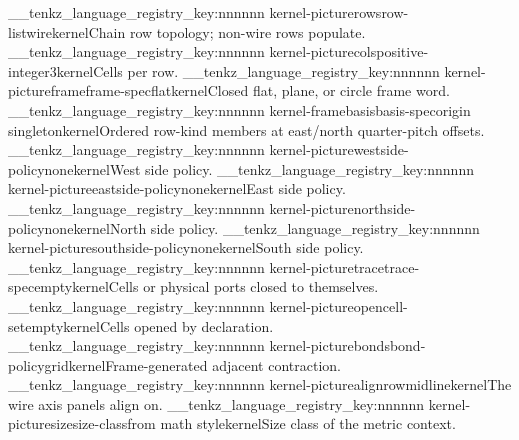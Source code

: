 \__tenkz_language_registry_key:nnnnnn {kernel-picture}{rows}{row-list}{{wire}}{kernel}{Chain row topology; non-wire rows populate.}
\__tenkz_language_registry_key:nnnnnn {kernel-picture}{cols}{positive-integer}{3}{kernel}{Cells per row.}
\__tenkz_language_registry_key:nnnnnn {kernel-picture}{frame}{frame-spec}{flat}{kernel}{Closed flat, plane, or circle frame word.}
\__tenkz_language_registry_key:nnnnnn {kernel-frame}{basis}{basis-spec}{origin singleton}{kernel}{Ordered row-kind members at east/north quarter-pitch offsets.}
\__tenkz_language_registry_key:nnnnnn {kernel-picture}{west}{side-policy}{none}{kernel}{West side policy.}
\__tenkz_language_registry_key:nnnnnn {kernel-picture}{east}{side-policy}{none}{kernel}{East side policy.}
\__tenkz_language_registry_key:nnnnnn {kernel-picture}{north}{side-policy}{none}{kernel}{North side policy.}
\__tenkz_language_registry_key:nnnnnn {kernel-picture}{south}{side-policy}{none}{kernel}{South side policy.}
\__tenkz_language_registry_key:nnnnnn {kernel-picture}{trace}{trace-spec}{empty}{kernel}{Cells or physical ports closed to themselves.}
\__tenkz_language_registry_key:nnnnnn {kernel-picture}{open}{cell-set}{empty}{kernel}{Cells opened by declaration.}
\__tenkz_language_registry_key:nnnnnn {kernel-picture}{bonds}{bond-policy}{grid}{kernel}{Frame-generated adjacent contraction.}
\__tenkz_language_registry_key:nnnnnn {kernel-picture}{align}{row}{midline}{kernel}{The wire axis panels align on.}
\__tenkz_language_registry_key:nnnnnn {kernel-picture}{size}{size-class}{from math style}{kernel}{Size class of the metric context.}
